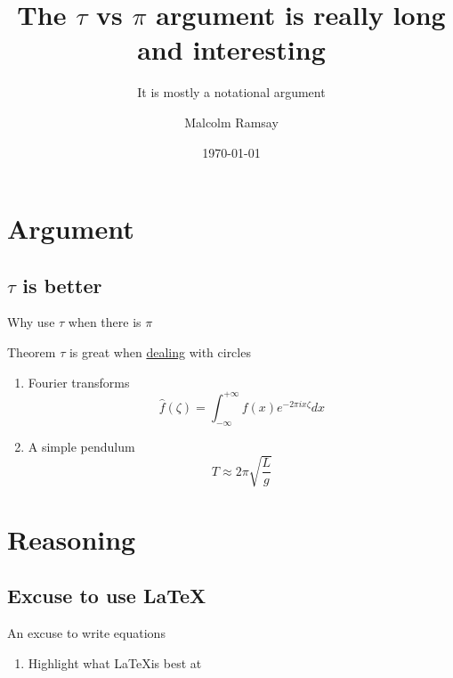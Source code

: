 \documentclass[aspectratio=169, 22pt]{beamer}
\title{The $\tau$ vs $\pi$ argument is really long and interesting}
\subtitle{It is mostly a notational argument}
\date{\today}
\author[Malcolm]{Malcolm Ramsay}
\begin{document}
\begin{frame}
  \titlepage{}
\end{frame}

\section{Argument}
\subsection{$\tau$ is better}

\begin{frame}{Why use $\tau$ when there is $\pi$}
  \begin{block}{Theorem}
    $\tau$ is great when \href{http://blah}{dealing} with circles
  \end{block}

  \begin{enumerate}
    \item<1-> Fourier transforms
      \begin{equation}
        \hat f(\zeta) = \int_{-\infty}^{+\infty} f(x) e^{-2\pi ix\zeta} dx
      \end{equation}
    \item<2-> A simple pendulum
      \begin{equation}
        T \approx 2\pi \sqrt{\frac{L}{g}}
      \end{equation}
  \end{enumerate}
\end{frame}

\section{Reasoning}
\subsection{Excuse to use \LaTeX}

\begin{frame}{An excuse to write equations}
  \begin{enumerate}
    \item Highlight what \LaTeX is best at
  \end{enumerate}
\end{frame}
\end{document}
